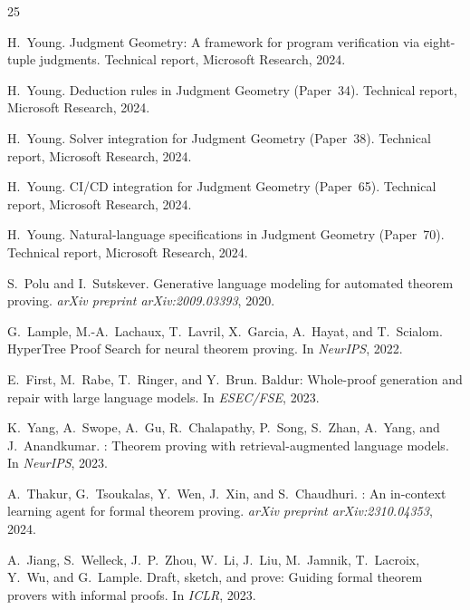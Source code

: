 \documentclass[11pt]{article}
\begin{document}
\begin{thebibliography}{25}

H.~Young.
\newblock Judgment Geometry: A framework for program verification via
  eight-tuple judgments.
\newblock Technical report, Microsoft Research, 2024.

H.~Young.
\newblock Deduction rules in Judgment Geometry (Paper~34).
\newblock Technical report, Microsoft Research, 2024.

H.~Young.
\newblock Solver integration for Judgment Geometry (Paper~38).
\newblock Technical report, Microsoft Research, 2024.

H.~Young.
\newblock CI/CD integration for Judgment Geometry (Paper~65).
\newblock Technical report, Microsoft Research, 2024.

H.~Young.
\newblock Natural-language specifications in Judgment Geometry (Paper~70).
\newblock Technical report, Microsoft Research, 2024.

S.~Polu and I.~Sutskever.
\newblock Generative language modeling for automated theorem proving.
\newblock \emph{arXiv preprint arXiv:2009.03393}, 2020.

G.~Lample, M.-A.~Lachaux, T.~Lavril, X.~Garcia, A.~Hayat, and
  T.~Scialom.
\newblock HyperTree Proof Search for neural theorem proving.
\newblock In \emph{NeurIPS}, 2022.

E.~First, M.~Rabe, T.~Ringer, and Y.~Brun.
\newblock Baldur: Whole-proof generation and repair with large language models.
\newblock In \emph{ESEC/FSE}, 2023.

K.~Yang, A.~Swope, A.~Gu, R.~Chalapathy, P.~Song, S.~Zhan,
  A.~Yang, and J.~Anandkumar.
: Theorem proving with retrieval-augmented language
  models.
\newblock In \emph{NeurIPS}, 2023.

A.~Thakur, G.~Tsoukalas, Y.~Wen, J.~Xin, and S.~Chaudhuri.
: An in-context learning agent for formal theorem proving.
\newblock \emph{arXiv preprint arXiv:2310.04353}, 2024.

A.~Jiang, S.~Welleck, J.~P.~Zhou, W.~Li, J.~Liu, M.~Jamnik,
  T.~Lacroix, Y.~Wu, and G.~Lample.
\newblock Draft, sketch, and prove: Guiding formal theorem provers with
  informal proofs.
\newblock In \emph{ICLR}, 2023.


\end{thebibliography}
\end{document}
